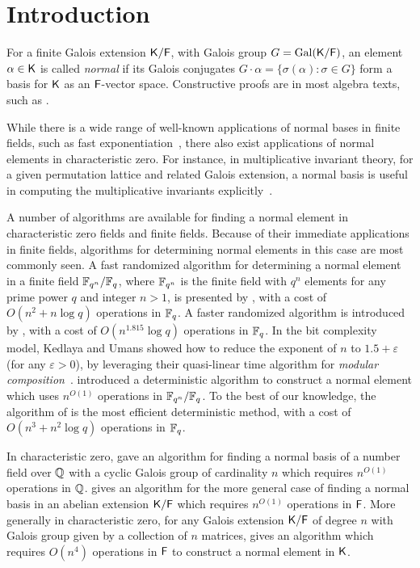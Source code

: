 \section{Introduction}

For a finite Galois extension ${\mathsf{K}}/{\mathsf{F}}$, with Galois group $G =
\mathrm{Gal}({\mathsf{K}}/{\mathsf{F}})$, an element $\alpha \in {\mathsf{K}}$ is called
\emph{normal} if its Galois conjugates $G \cdot \alpha = \{
\sigma(\alpha): \sigma\in G\}$ form a basis for ${\mathsf{K}}$ as an ${\mathsf{F}}$-vector
space. Constructive proofs are in most algebra texts, such as
\cite[\S6.13]{Lang}.

 
While there is a wide range of well-known applications of normal bases in
finite fields, such as fast exponentiation~\cite{GaGaPaSh00}, there also
exist applications of normal elements in characteristic zero.  For instance,
in multiplicative invariant theory, for a given permutation lattice and
related Galois extension, a normal basis is useful in computing the
multiplicative invariants explicitly~\cite{Jam18}.

A number of algorithms are available for finding a normal element in
characteristic zero fields and finite fields.  Because of their immediate
applications in finite fields, algorithms for determining normal elements
in this case are most commonly seen.  A fast randomized algorithm for
determining a normal element in a finite field ${\mathbb{F}}_{q^n}/{\mathbb{F}}_q$, where
${\mathbb{F}}_{q^n}$ is the finite field with $q^n$ elements for any prime power $q$
and integer $n>1$, is presented by , with a cost of
$O(n^2+n\log q)$ operations in ${\mathbb{F}}_q$.  A faster randomized algorithm is
introduced by , with a cost of $O(n^{1.815}\log q)$
operations in ${\mathbb{F}}_q$.  In the bit complexity model, Kedlaya and Umans showed
how to reduce the exponent of $n$ to $1.5+\varepsilon$ (for any
$\varepsilon > 0$), by leveraging their quasi-linear time algorithm for
{\em modular composition}~\cite{KeUm11}.  introduced a
deterministic algorithm to construct a normal element which uses $n^{O(1)}$
operations in ${\mathbb{F}}_{q^n}/{\mathbb{F}}_q$.  To the best of our knowledge, the
algorithm of  is the most efficient deterministic method,
with a cost of $O(n^3+n^2\log q)$ operations in ${\mathbb{F}}_q$.

In characteristic zero,  gave an algorithm for finding
a normal basis of a number field over $\mathbb{Q}$ with a cyclic Galois group
of cardinality $n$ which requires $n^{O(1)}$ operations in $\mathbb{Q}$.
 gives an algorithm for the more general case of finding
a normal basis in an abelian extension ${\mathsf{K}}/{\mathsf{F}}$ which requires
$n^{O(1)}$ operations in ${\mathsf{F}}$.  More generally in characteristic zero, for any
Galois extension ${\mathsf{K}}/{\mathsf{F}}$ of degree $n$ with Galois group given by a
collection of $n$ matrices,  gives an algorithm which
requires $O(n^4)$ operations in ${\mathsf{F}}$ to construct a normal element in
${\mathsf{K}}$.

